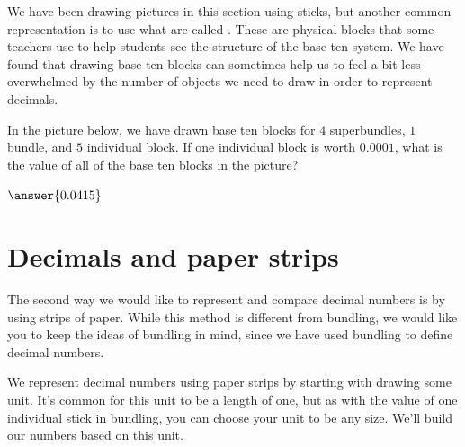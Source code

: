 \documentclass{ximera}
\begin{document}
%
%
%
We have been drawing pictures in this section using sticks, but another common representation is to use what are called . These are physical blocks that some teachers use to help students see the structure of the base ten system. We have found that drawing base ten blocks can sometimes help us to feel a bit less overwhelmed by the number of objects we need to draw in order to represent decimals.

\begin{question}
In the picture below, we have drawn base ten blocks for $4$ superbundles, $1$ bundle, and $5$ individual block. If one individual block is worth $0.0001$, what is the value of all of the base ten blocks in the picture?
\begin{image}
\end{image}

\begin{prompt}
$\answer{0.0415}$
\end{prompt}
\end{question}


\section{Decimals and paper strips}

The second way we would like to represent and compare decimal numbers is by using strips of paper. While this method is different from bundling, we would like you to keep the ideas of bundling in mind, since we have used bundling to define decimal numbers.

We represent decimal numbers using paper strips by starting with drawing some unit. It's common for this unit to be a length of one, but as with the value of one individual stick in bundling, you can choose your unit to be any size. We'll build our numbers based on this unit.
\end{document}
